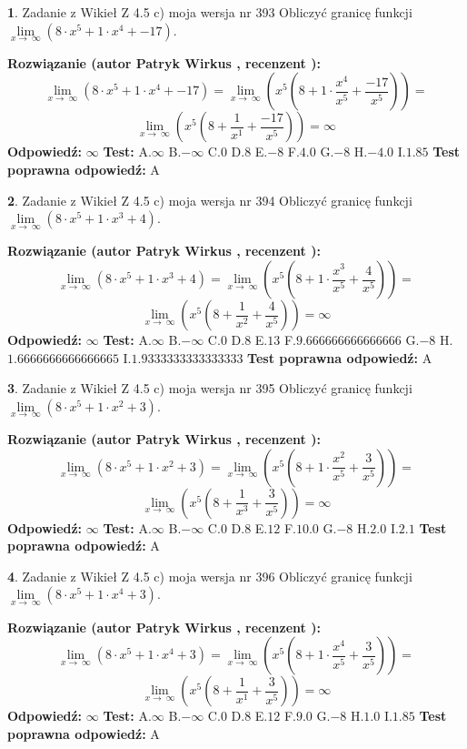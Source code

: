 \documentclass[12pt, a4paper]{article}
\theoremstyle{definition} %
\newtheorem{zad}{}
\newcommand{\zadStart}[1]{\begin{zad}#1\newline}
\newcommand{\zadStop}{\end{zad}}
\newcommand{\rozwStart}[2]{\noindent \textbf{Rozwiązanie (autor #1 , recenzent #2): }\newline}
\newcommand{\rozwStop}{\newline}
\newcommand{\odpStart}{\noindent \textbf{Odpowiedź:}\newline}
\newcommand{\odpStop}{\newline}
\newcommand{\testStart}{\noindent \textbf{Test:}\newline}
\newcommand{\testStop}{\newline}
\newcommand{\kluczStart}{\noindent \textbf{Test poprawna odpowiedź:}\newline}
\newcommand{\kluczStop}{\newline}
\begin{document}
\zadStart{Zadanie z Wikieł Z 4.5 c) moja wersja nr 393}
Obliczyć granicę funkcji  $\lim\limits_{x\to\ \infty}(8 \cdot x^{5}+1 \cdot x^{4}+-17)$.
\zadStop
\rozwStart{Patryk Wirkus}{}
$$\lim\limits_{x\to\ \infty}(8 \cdot x^{5}+1 \cdot x^{4}+-17) = \lim\limits_{x\to\ \infty}(x^{5}(8 +1 \cdot \frac{x^{4}}{x^{5}}+\frac{-17}{x^{5}})) =$$ $$\lim\limits_{x\to\ \infty}(x^{5}(8 +\frac{1}{x^{1}}+\frac{-17}{x^{5}})) =\infty$$
\rozwStop
\odpStart
$\infty$
\odpStop
\testStart
A.$\infty$ B.$-\infty$ C.$0$ D.$8$ E.$-8$
F.$4.0$ G.$-8$
H.$-4.0$
I.$1.85$
\testStop
\kluczStart
A
\kluczStop



\zadStart{Zadanie z Wikieł Z 4.5 c) moja wersja nr 394}
Obliczyć granicę funkcji  $\lim\limits_{x\to\ \infty}(8 \cdot x^{5}+1 \cdot x^{3}+4)$.
\zadStop
\rozwStart{Patryk Wirkus}{}
$$\lim\limits_{x\to\ \infty}(8 \cdot x^{5}+1 \cdot x^{3}+4) = \lim\limits_{x\to\ \infty}(x^{5}(8 +1 \cdot \frac{x^{3}}{x^{5}}+\frac{4}{x^{5}})) =$$ $$\lim\limits_{x\to\ \infty}(x^{5}(8 +\frac{1}{x^{2}}+\frac{4}{x^{5}})) =\infty$$
\rozwStop
\odpStart
$\infty$
\odpStop
\testStart
A.$\infty$ B.$-\infty$ C.$0$ D.$8$ E.$13$
F.$9.666666666666666$ G.$-8$
H.$1.6666666666666665$
I.$1.9333333333333333$
\testStop
\kluczStart
A
\kluczStop



\zadStart{Zadanie z Wikieł Z 4.5 c) moja wersja nr 395}
Obliczyć granicę funkcji  $\lim\limits_{x\to\ \infty}(8 \cdot x^{5}+1 \cdot x^{2}+3)$.
\zadStop
\rozwStart{Patryk Wirkus}{}
$$\lim\limits_{x\to\ \infty}(8 \cdot x^{5}+1 \cdot x^{2}+3) = \lim\limits_{x\to\ \infty}(x^{5}(8 +1 \cdot \frac{x^{2}}{x^{5}}+\frac{3}{x^{5}})) =$$ $$\lim\limits_{x\to\ \infty}(x^{5}(8 +\frac{1}{x^{3}}+\frac{3}{x^{5}})) =\infty$$
\rozwStop
\odpStart
$\infty$
\odpStop
\testStart
A.$\infty$ B.$-\infty$ C.$0$ D.$8$ E.$12$
F.$10.0$ G.$-8$
H.$2.0$
I.$2.1$
\testStop
\kluczStart
A
\kluczStop



\zadStart{Zadanie z Wikieł Z 4.5 c) moja wersja nr 396}
Obliczyć granicę funkcji  $\lim\limits_{x\to\ \infty}(8 \cdot x^{5}+1 \cdot x^{4}+3)$.
\zadStop
\rozwStart{Patryk Wirkus}{}
$$\lim\limits_{x\to\ \infty}(8 \cdot x^{5}+1 \cdot x^{4}+3) = \lim\limits_{x\to\ \infty}(x^{5}(8 +1 \cdot \frac{x^{4}}{x^{5}}+\frac{3}{x^{5}})) =$$ $$\lim\limits_{x\to\ \infty}(x^{5}(8 +\frac{1}{x^{1}}+\frac{3}{x^{5}})) =\infty$$
\rozwStop
\odpStart
$\infty$
\odpStop
\testStart
A.$\infty$ B.$-\infty$ C.$0$ D.$8$ E.$12$
F.$9.0$ G.$-8$
H.$1.0$
I.$1.85$
\testStop
\kluczStart
A
\kluczStop
\end{document}
